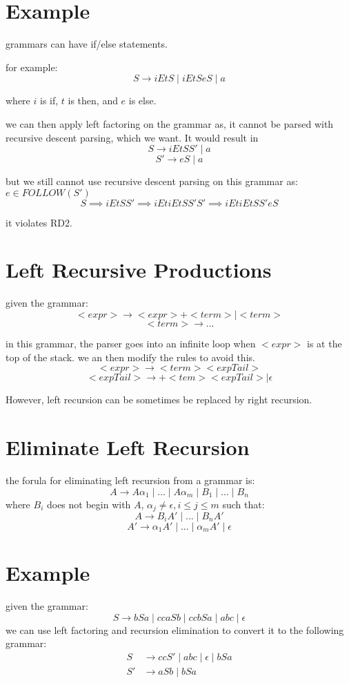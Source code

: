 \documentclass[12pt]{book}
\title{\coursetitle\linebreak\lecturename}
\author{\\Cain Susko\\ 
           \\ \\ \\
      Queen's University 
    \\School of Computing\\}
\begin{document}
\begin{titlepage}
        \maketitle
\end{titlepage}


\section*{Example}
grammars can have if/else statements.

for example:
\[S \to iEtS \mid iEtSeS \mid a\]

where $i$ is if, $t$ is then, and $e$ is else.

we can then apply left factoring on the grammar as, it cannot be parsed with recursive descent parsing, which we want.
It would result in 
\[S \to iEtSS' \mid a\]
\[S' \to eS \mid a\]

but we still cannot use recursive descent parsing on this grammar as: $e \in FOLLOW(S')$
\[S \implies iEtSS'\implies iEtiEtSS'S' \implies iEtiEtSS'eS\]

it violates RD2.

\section*{Left Recursive Productions}
given the grammar:
\[<expr> \to <expr> + <term> \mid <term>\]
\[<term> \to ...\]

in this grammar, the parser goes into an infinite loop when $<expr>$ is at the top of the stack.
we an then modify the rules to avoid this.
\[<expr> \to <term> <expTail>\]
\[<expTail> \to + <tem><expTail> \mid \epsilon\]

However, left recursion can be sometimes be replaced by right recursion.

\section*{Eliminate Left Recursion}
the forula for eliminating left recursion from a grammar is:
\[A \to A\alpha_1 \mid ... \mid A\alpha_m\mid B_1\mid ...\mid B_n\]
where $B_i$ does not begin with $A$, $\alpha_j \neq \epsilon, i \leq j \leq m$
such that:
\[A\to B_iA' \mid ... \mid B_nA'\]
\[A' \to \alpha_1 A' \mid ... \mid \alpha_m A' \mid \epsilon\]

\section*{Example}
given the grammar:
\[S \to bSa \mid ccaSb \mid ccbSa \mid abc \mid \epsilon\]
we can use left factoring and recursion elimination to convert it to the following grammar:
\begin{align*}
        S &\to ccS' \mid abc \mid \epsilon \mid bSa\\
        S' &\to aSb \mid bSa
\end{align*}
\end{document}
